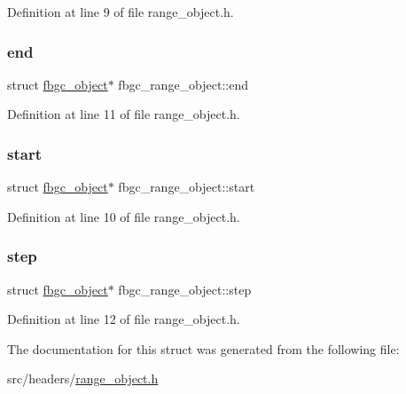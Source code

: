 Definition at line 9 of file range\+\_\+object.\+h.

\mbox{\label{structfbgc__range__object_a7fb7c65504b4209fea99ae2eeaae12ac}} 
\subsubsection{\texorpdfstring{end}{end}}
{\footnotesize\ttfamily struct \hyperlink{structfbgc__object}{fbgc\+\_\+object}$\ast$ fbgc\+\_\+range\+\_\+object\+::end}



Definition at line 11 of file range\+\_\+object.\+h.

\mbox{\label{structfbgc__range__object_a0d496a131fc3701f21ba29bfb4213062}} 
\subsubsection{\texorpdfstring{start}{start}}
{\footnotesize\ttfamily struct \hyperlink{structfbgc__object}{fbgc\+\_\+object}$\ast$ fbgc\+\_\+range\+\_\+object\+::start}



Definition at line 10 of file range\+\_\+object.\+h.

\mbox{\label{structfbgc__range__object_a31d9d9edc8b0cf114d83dabb8daadd74}} 
\subsubsection{\texorpdfstring{step}{step}}
{\footnotesize\ttfamily struct \hyperlink{structfbgc__object}{fbgc\+\_\+object}$\ast$ fbgc\+\_\+range\+\_\+object\+::step}



Definition at line 12 of file range\+\_\+object.\+h.



The documentation for this struct was generated from the following file\+:\begin{DoxyCompactItemize}
\item 
src/headers/\hyperlink{range__object_8h}{range\+\_\+object.\+h}\end{DoxyCompactItemize}
